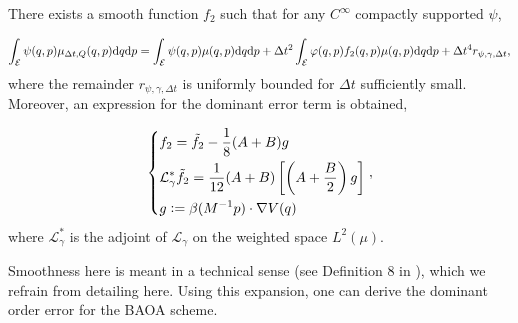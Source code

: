 \begin{theorem}
  \label{thm:baoab_error}
  There exists a smooth function $f_2$ such that for any $C^\infty$ compactly supported $\psi$,

  \begin{equation}
    \label{BAOAB expansion}
   \int_{\mathcal E}\psi(q,p) \mu_{\Delta t,Q}(q,p) \mathrm{d} q \mathrm{d}p=\int_{\mathcal E}\psi(q,p)\mu(q,p)\mathrm{d}q \mathrm{d}p+\Delta t^2\int_{\mathcal E}\varphi(q,p) f_2(q,p)\mu(q,p)\mathrm{d}q \mathrm{d}p + \Delta t^4 r_{\psi,\gamma,\Delta t},
  \end{equation}
  where the remainder $r_{\psi,\gamma,\Delta t}$ is uniformly bounded for $\Delta t$ sufficiently small. Moreover, an expression for the dominant error term is obtained, 
  
  \begin{equation}
    \label{remainder term}
    \left\{\begin{aligned}
    &f_2=\tilde f_2-\frac18(A+B)g\\
    &\mathcal L^{*}_\gamma\tilde f_2=\frac1{12}(A+B)\left[\left(A+\frac B2\right)g\right]\\
    &g\mathrel{\mathop:}=\beta(M^{-1}p)\cdot \nabla V(q)
    \end{aligned}\right.,
  \end{equation}
  where $\mathcal L^*_\gamma$ is the adjoint of $\mathcal L_\gamma$ on the weighted space $L^2(\mu)$.  
\end{theorem}
 Smoothness here is meant in a technical sense (see Definition 8 in \cite{LMS13}), which we refrain from detailing here. Using this expansion, one can derive the dominant order error for the BAOA scheme.


